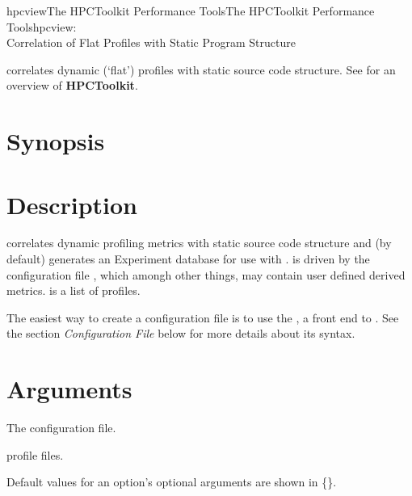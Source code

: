 \documentclass[english]{article}
\begin{document}
\begin{Name}{1}{hpcview}{The HPCToolkit Performance Tools}{The HPCToolkit Performance Tools}{hpcview:\\ Correlation of Flat Profiles with Static Program Structure}

 correlates dynamic (`flat') profiles with static source code structure.  See  for an overview of \textbf{HPCToolkit}.

\end{Name}

\section{Synopsis}

   

\section{Description}

 correlates dynamic profiling metrics with static source code structure and (by default) generates an Experiment database for use with .
 is driven by the configuration file , which amongh other things, may contain user defined derived metrics.
 is a list of  profiles.

The easiest way to create a configuration file is to use the , a front end to .
See the section \emph{Configuration File} below for more details about its syntax.

\section{Arguments}

\begin{Description}
\item[\Arg{config-file...}] The  configuration file.
\item[\Arg{profile-file...}]  profile files.
\end{Description}

Default values for an option's optional arguments are shown in \{\}.
\end{document}
